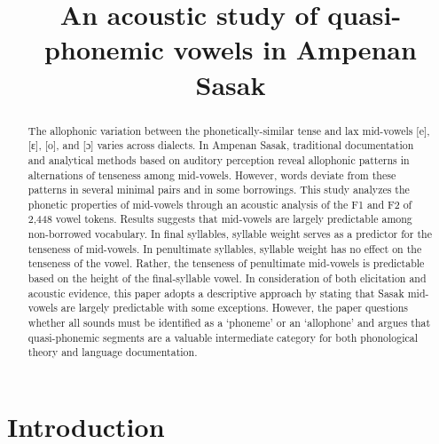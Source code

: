 \documentclass[12pt]{ouparticle}
\title{An acoustic study of quasi-phonemic vowels in Ampenan Sasak}
\begin{document}
\maketitle

\begin{abstract}

The allophonic variation between the phonetically-similar tense and lax mid-vowels [e], [ɛ], [o], and [ɔ] varies across dialects. In Ampenan Sasak, traditional documentation and analytical methods based on auditory perception reveal allophonic patterns in alternations of tenseness among mid-vowels. However, words deviate from these patterns in several minimal pairs and in some borrowings. This study analyzes the phonetic properties of mid-vowels through an acoustic analysis of the F1 and F2 of 2,448 vowel tokens. Results suggests that mid-vowels are largely predictable among non-borrowed vocabulary. In final syllables, syllable weight serves as a predictor for the tenseness of mid-vowels. In penultimate syllables, syllable weight has no effect on the tenseness of the vowel. Rather, the tenseness of penultimate mid-vowels is predictable based on the height of the final-syllable vowel. In consideration of both elicitation and acoustic evidence, this paper adopts a descriptive approach by stating that Sasak mid-vowels are largely predictable with some exceptions. However, the paper questions whether all sounds must be identified as a ‘phoneme’ or an ‘allophone’ and argues that quasi-phonemic segments are a valuable intermediate category for both phonological theory and language documentation. 


\end{abstract}

\newpage



\section{Introduction}\label{sec:introduction}
\end{document}
